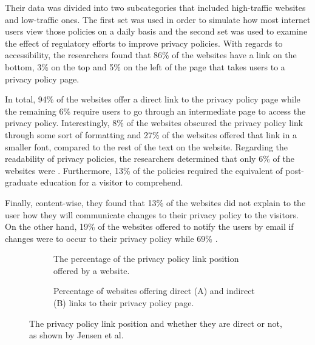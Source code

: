 \documentclass[../main.tex]{subfiles}
\begin{document}
Their data was divided into two subcategories that included high-traffic websites and low-traffic ones. The first set was used in order to simulate how most internet users view those policies on a daily basis and the second set was used to examine the effect of regulatory efforts to improve privacy policies. With regards to accessibility, the researchers found that 86\% of the websites have a link on the bottom, 3\% on the top and 5\% on the left of the page that takes users to a privacy policy page. 

In total, 94\% of the websites offer a direct link to the privacy policy page while the remaining 6\% require users to go through an intermediate page to access the privacy policy. Interestingly, 8\% of the websites obscured the privacy policy link through some sort of formatting and 27\% of the websites offered that link in a smaller font, compared to the rest of the text on the website. Regarding the readability of privacy policies, the researchers determined that only 6\% of the websites were . Furthermore, 13\% of the policies required the equivalent of post-graduate education for a visitor to comprehend. 

Finally, content-wise, they found that 13\% of the websites did not explain to the user how they will communicate changes to their privacy policy to the visitors. On the other hand, 19\% of the websites offered to notify the users by email if changes were to occur to their privacy policy while 69\% .

\begin{figure}[ht]
    \centering
    \begin{subfigure}[b]{0.45\textwidth}
        \centering
        \caption{The percentage of the privacy policy link position offered by a website.}
        \label{tab:jensen_a}
    \end{subfigure}
    \hfill
    \begin{subfigure}[b]{0.45\textwidth}
        \centering
        \caption{Percentage of websites offering direct (A) and indirect (B) links to their privacy policy page.}
        \label{fig:jensen_b}
    \end{subfigure}
    \caption{The privacy policy link position and whether they are direct or not, as shown by Jensen et al.}
    \label{fig:jensen}
\end{figure}
\end{document}
